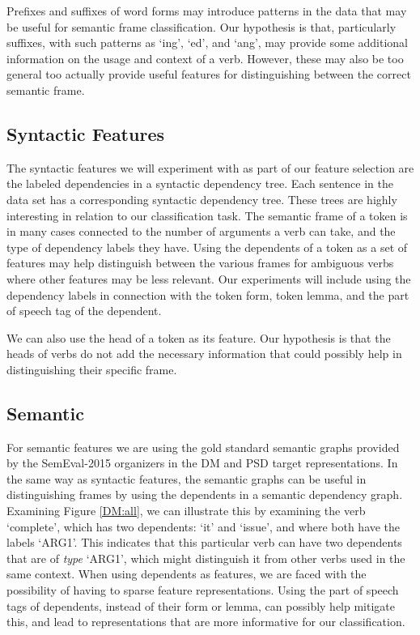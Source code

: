 Prefixes and suffixes of word forms may introduce patterns in the data that may be useful for semantic frame classification. Our hypothesis is that, particularly suffixes, with such patterns as `ing', `ed', and `ang', may provide some additional information on the usage and context of a verb. However, these may also be too general too actually provide useful features for distinguishing between the correct semantic frame.

\subsection{Syntactic Features}

The syntactic features we will experiment with as part of our feature selection are the labeled dependencies in a syntactic dependency tree. Each sentence in the data set has a corresponding syntactic dependency tree. These trees are highly interesting in relation to our classification task. The semantic frame of a token is in many cases connected to the number of arguments a verb can take, and the type of dependency labels they have. Using the dependents of a token as a set of features may help distinguish between the various frames for ambiguous verbs where other features may be less relevant. Our experiments will include using the dependency labels in connection with the token form, token lemma, and the part of speech tag of the dependent.

We can also use the head of a token as its feature. Our hypothesis is that the heads of verbs do not add the necessary information that could possibly help in distinguishing their specific frame.

\subsection{Semantic}

For semantic features we are using the gold standard semantic graphs provided by the SemEval-2015 organizers in the DM and PSD target representations. In the same way as syntactic features, the semantic graphs can be useful in distinguishing frames by using the dependents in a semantic dependency graph. Examining Figure \ref{DM:all}, we can illustrate this by examining the verb `complete', which has two dependents: `it' and `issue', and where both have the labels `ARG1'. This indicates that this particular verb can have two dependents that are of \textit{type} `ARG1', which might distinguish it from other verbs used in the same context. When using dependents as features, we are faced with the possibility of having to sparse feature representations. Using the part of speech tags of dependents, instead of their form or lemma, can possibly help mitigate this, and lead to representations that are more informative for our classification.

